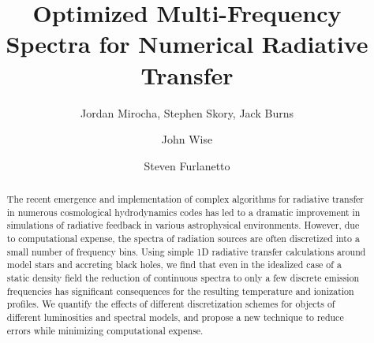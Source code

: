 \documentclass[preprint2]{aastex}              %
\begin{document}
    
\newcommand{\HI}{\text{HI}}
\newcommand{\HII}{\text{HII}}
\newcommand{\HeI}{\text{HeI}}
\newcommand{\HeII}{\text{HeII}}
\newcommand{\HeIII}{\text{HeIII}}
\newcommand{\nHI}{n_{\text{HI}}} 
\newcommand{\nHII}{n_{\text{HII}}}  
\newcommand{\nHeI}{n_{\text{HeI}}}
\newcommand{\nHeII}{n_{\text{HeII}}}
\newcommand{\nHeIII}{n_{\text{HeIII}}}  
\newcommand{\nel}{n_{\text{e}}}  
\newcommand{\nb}{n_{\text{b}}}
\newcommand{\nnu}{$n_{\nu}$ }
\newcommand{\ncol}{n_i^{\text{col}}}
\newcommand{\gHI}{\Gamma_{\text{HI}}}  
\newcommand{\gHeI}{\Gamma_{\text{HeI}}}
\newcommand{\gHeII}{\Gamma_{\text{HeII}}}
\newcommand{\aHII}{\alpha_{\text{HII}}}  
\newcommand{\aHeII}{\alpha_{\text{HeII}}}  
\newcommand{\aHeIII}{\alpha_{\text{HeIII}}} 
\newcommand{\bHeI}{\beta_{\text{HeI}}}  
\newcommand{\bHeII}{\beta_{\text{HeII}}}  
\newcommand{\xHeII}{\xi_{\text{HeII}}}
\newcommand{\kB}{k_{\text{B}}}
\newcommand{\fheat}{f_{\text{heat}}}
\newcommand{\Lbol}{\mathcal{L}_{\text{bol}}}
\newcommand{\spec}{\mathcal{N}}
\newcommand{\Heat}{\mathcal{H}}

\title {Optimized Multi-Frequency Spectra for Numerical Radiative Transfer}
\author{Jordan Mirocha, Stephen Skory, Jack Burns}
\author{John Wise}
\author{Steven Furlanetto}

\begin{abstract}
The recent emergence and implementation of complex algorithms for radiative transfer in numerous cosmological hydrodynamics codes has led to a dramatic improvement in simulations of radiative feedback in various astrophysical environments.  However, due to computational expense, the spectra of radiation sources are often discretized into a small number of frequency bins.  Using simple 1D radiative transfer calculations around model stars and accreting black holes, we find that even in the idealized case of a static density field the reduction of continuous spectra to only a few discrete emission frequencies has significant consequences for the resulting temperature and ionization profiles.  We quantify the effects of different discretization schemes for objects of different luminosities and spectral models, and propose a new technique to reduce errors while minimizing computational expense.
\end{abstract} 
\end{document}
